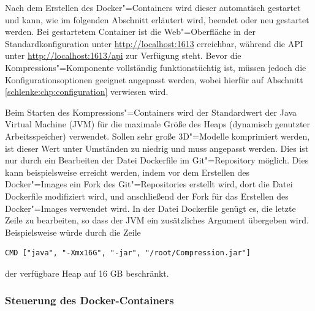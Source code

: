 Nach dem Erstellen des Docker"=Containers wird dieser automatisch gestartet und kann, wie im folgenden Abschnitt erläutert wird, beendet oder neu gestartet werden. Bei gestartetem Container ist die Web"=Oberfläche in der Standardkonfiguration unter \url{http://localhost:1613} erreichbar, während die API unter \url{http://localhost:1613/api} zur Verfügung steht. Bevor die Kompressions"=Komponente vollständig funktionstüchtig ist, müssen jedoch die Konfigurationsoptionen geeignet angepasst werden, wobei hierfür auf Abschnitt \ref{schlenke:chp:configuration} verwiesen wird.

Beim Starten des Kompressions"=Containers wird der Standardwert der Java Virtual Machine (JVM) für die maximale Größe des Heaps (dynamisch genutzter Arbeitsspeicher) verwendet. Sollen sehr große 3D"=Modelle komprimiert werden, ist dieser Wert unter Umständen zu niedrig und muss angepasst werden. Dies ist nur durch ein Bearbeiten der Datei {\ttfamily Dockerfile} im Git"=Repository möglich. Dies kann beispielsweise erreicht werden, indem vor dem Erstellen des Docker"=Images ein Fork des Git"=Repositories erstellt wird, dort die Datei {\ttfamily Dockerfile} modifiziert wird, und anschließend der Fork für das Erstellen des Docker"=Images verwendet wird. In der Datei {\ttfamily Dockerfile} genügt es, die letzte Zeile zu bearbeiten, so dass der JVM ein zusätzliches Argument übergeben wird. Beispielsweise würde durch die Zeile 
\begin{lstlisting}[caption=Ausführen einer JAR-Datei mit Argument für die maximale Heap-Größe]
CMD ["java", "-Xmx16G", "-jar", "/root/Compression.jar"]
\end{lstlisting}
der verfügbare Heap auf 16 GB beschränkt.


\subsubsection{Steuerung des Docker-Containers}

